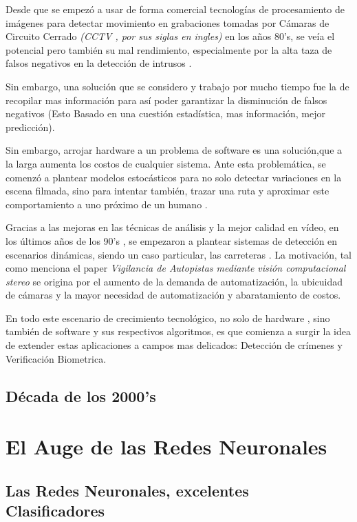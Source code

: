 \documentclass[a4paper]{IEEEtranUNT}
\begin{document}
Desde que se empezó a usar de forma comercial tecnologías de procesamiento de imágenes para detectar movimiento en
grabaciones tomadas por Cámaras de Circuito Cerrado \textit{(CCTV , por sus siglas en ingles)} en los a\~nos 80's,
se veía el potencial pero también su mal rendimiento, especialmente por la alta taza de falsos negativos 
en la detección de intrusos \citep{Sage}.

Sin embargo, una solución que se considero y trabajo por mucho tiempo fue la de recopilar mas información para así poder
garantizar la disminución de falsos negativos (Esto Basado en una cuestión estadística, mas información, mejor predicción).

Sin embargo, arrojar hardware a un problema de software es una solución,que a la larga aumenta los costos de cualquier sistema.
Ante esta problemática, se comenzó a plantear modelos estocásticos para no solo detectar variaciones en la escena filmada, sino
para intentar también, trazar una ruta y aproximar este comportamiento a uno próximo de un humano \citep{Sage}.

Gracias a las mejoras en las técnicas de análisis y la mejor calidad en vídeo, en los últimos a\~nos de los 90's , se empezaron
a plantear sistemas de detección en escenarios dinámicas, siendo un caso particular, las carreteras \citep{Manendez}. La motivación,
tal como menciona el paper \textit{Vigilancia de Autopistas mediante visión computacional stereo} \citep[Abstract]{Manendez}
se origina por el aumento de la demanda de automatización, la ubicuidad de cámaras y la mayor necesidad de automatización y abaratamiento
de costos.

En todo este escenario de crecimiento tecnológico, no solo de hardware , sino también de software y sus respectivos algoritmos, es que
comienza a surgir la idea de extender estas aplicaciones a campos mas delicados: Detección de crímenes y Verificación Biometrica.

\subsection{Década de los 2000's}



\section{El Auge de las Redes Neuronales}

\subsection{Las Redes Neuronales, excelentes Clasificadores}
\end{document}
